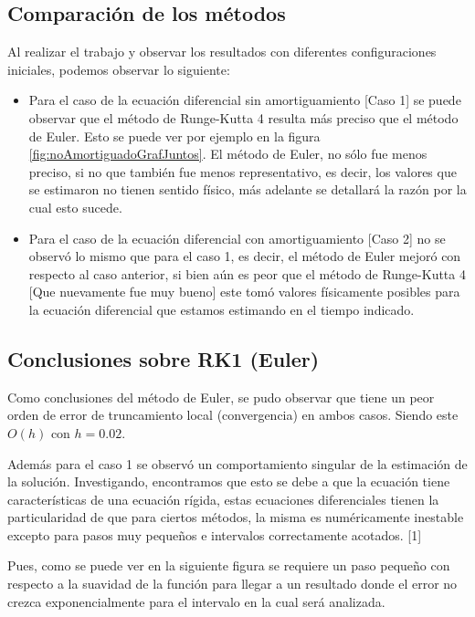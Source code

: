 \documentclass[titlepage,a4paper]{article}
\begin{document}
\subsection{Comparación de los métodos}\label{sec:comparacion}
    Al realizar el trabajo y observar los resultados con diferentes configuraciones iniciales, podemos observar lo siguiente:
    \begin{itemize}
        \item Para el caso de la ecuación diferencial sin amortiguamiento [Caso 1] se puede observar que el método de Runge-Kutta 4 resulta más preciso que el método de Euler. Esto se puede ver por ejemplo en la figura \ref{fig:noAmortiguadoGrafJuntos}. El método de Euler, no sólo fue menos preciso, si no que también fue menos representativo, es decir, los valores que se estimaron no tienen sentido físico, más adelante se detallará la razón por la cual esto sucede.
        
        \item Para el caso de la ecuación diferencial con amortiguamiento  [Caso 2] no se observó lo mismo que para el caso 1, es decir, el método de Euler mejoró con respecto al caso anterior, si bien aún es peor que el método de Runge-Kutta 4 [Que nuevamente fue muy bueno] este tomó valores físicamente posibles para la ecuación diferencial que estamos estimando en el tiempo indicado.
    \end{itemize}

\subsection{Conclusiones sobre RK1 (Euler)}\label{sec:RK1}
    Como conclusiones del método de Euler, se pudo observar que tiene un peor orden de error de truncamiento local (convergencia) en ambos casos. Siendo este $O(h)$ con $h = 0.02$.
    
    Además para el caso 1 se observó un comportamiento singular de la estimación de la solución.
    Investigando, encontramos que esto se debe a que la ecuación tiene características de una ecuación rígida, estas ecuaciones diferenciales tienen la particularidad de que para ciertos métodos, la misma es numéricamente inestable excepto para pasos muy pequeños e intervalos correctamente acotados. [1]

    Pues, como se puede ver en la siguiente figura se requiere un paso pequeño con respecto a la suavidad de la función para llegar a un resultado donde el error no crezca exponencialmente para el intervalo en la cual será analizada.
    
\end{document}
